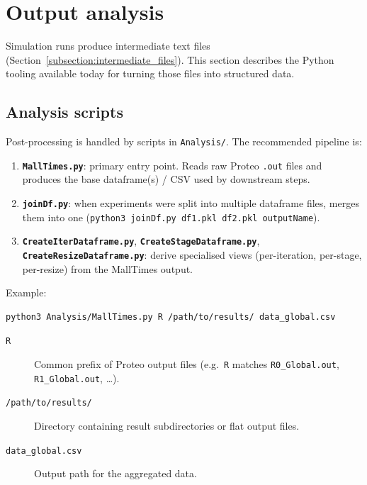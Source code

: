 \section{Output analysis}
\label{section:analysis}

Simulation runs produce intermediate text files (Section~\ref{subsection:intermediate_files}). This section describes the Python tooling available today for turning those files into structured data.

\subsection{Analysis scripts}

Post-processing is handled by scripts in \texttt{Analysis/}. The recommended pipeline is:

\begin{enumerate}
  \item \textbf{\texttt{MallTimes.py}}: primary entry point. Reads raw Proteo \texttt{.out} files and produces the base dataframe(s) / CSV used by downstream steps.
  \item \textbf{\texttt{joinDf.py}}: when experiments were split into multiple dataframe files, merges them into one (\texttt{python3 joinDf.py df1.pkl df2.pkl outputName}).
  \item \textbf{\texttt{CreateIterDataframe.py}}, \textbf{\texttt{CreateStageDataframe.py}}, \textbf{\texttt{CreateResizeDataframe.py}}: derive specialised views (per-iteration, per-stage, per-resize) from the MallTimes output.
\end{enumerate}

Example:

\begin{lstlisting}[style=bashstyle,caption={Build base dataframe from result files.},captionpos=b]
python3 Analysis/MallTimes.py R /path/to/results/ data_global.csv
\end{lstlisting}

\begin{description}
  \item[\texttt{R}] Common prefix of Proteo output files (e.g.\ \texttt{R} matches \texttt{R0\_Global.out}, \texttt{R1\_Global.out}, \ldots).
  \item[\texttt{/path/to/results/}] Directory containing result subdirectories or flat output files.
  \item[\texttt{data\_global.csv}] Output path for the aggregated data.
\end{description}


